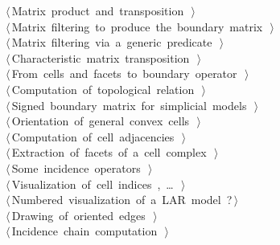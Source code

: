 \documentclass[11pt,oneside]{article}    %
\begin{document}
\begin{flushleft}
\begin{list}{}{}
\mbox{}\verb@@\hbox{$\langle\,$Matrix product and transposition\nobreak\ {\footnotesize {}}$\,\rangle$}\verb@@\\
\mbox{}\verb@@\hbox{$\langle\,$Matrix filtering to produce the boundary matrix\nobreak\ {\footnotesize {}}$\,\rangle$}\verb@@\\
\mbox{}\verb@@\hbox{$\langle\,$Matrix filtering via a generic predicate\nobreak\ {\footnotesize {}}$\,\rangle$}\verb@@\\
\mbox{}\verb@@\hbox{$\langle\,$Characteristic matrix transposition\nobreak\ {\footnotesize {}}$\,\rangle$}\verb@@\\
\mbox{}\verb@@\hbox{$\langle\,$From cells and facets to boundary operator\nobreak\ {\footnotesize {}}$\,\rangle$}\verb@@\\
\mbox{}\verb@@\hbox{$\langle\,$Computation of topological relation\nobreak\ {\footnotesize {}}$\,\rangle$}\verb@@\\
\mbox{}\verb@@\hbox{$\langle\,$Signed boundary matrix for simplicial models\nobreak\ {\footnotesize {}}$\,\rangle$}\verb@@\\
\mbox{}\verb@@\hbox{$\langle\,$Orientation of general convex cells\nobreak\ {\footnotesize {}}$\,\rangle$}\verb@@\\
\mbox{}\verb@@\hbox{$\langle\,$Computation of cell adjacencies\nobreak\ {\footnotesize {}}$\,\rangle$}\verb@@\\
\mbox{}\verb@@\hbox{$\langle\,$Extraction of facets of a cell complex\nobreak\ {\footnotesize {}}$\,\rangle$}\verb@@\\
\mbox{}\verb@@\hbox{$\langle\,$Some incidence operators\nobreak\ {\footnotesize {}}$\,\rangle$}\verb@@\\
\mbox{}\verb@@\hbox{$\langle\,$Visualization of cell indices\nobreak\ {\footnotesize {}, \ldots\ }$\,\rangle$}\verb@@\\
\mbox{}\verb@@\hbox{$\langle\,$Numbered visualization of a LAR model\nobreak\ {\footnotesize ?}$\,\rangle$}\verb@@\\
\mbox{}\verb@@\hbox{$\langle\,$Drawing of oriented edges\nobreak\ {\footnotesize {}}$\,\rangle$}\verb@@\\
\mbox{}\verb@@\hbox{$\langle\,$Incidence chain computation\nobreak\ {\footnotesize {}}$\,\rangle$}\verb@@\\

\end{list}
\end{flushleft}
\end{document}
